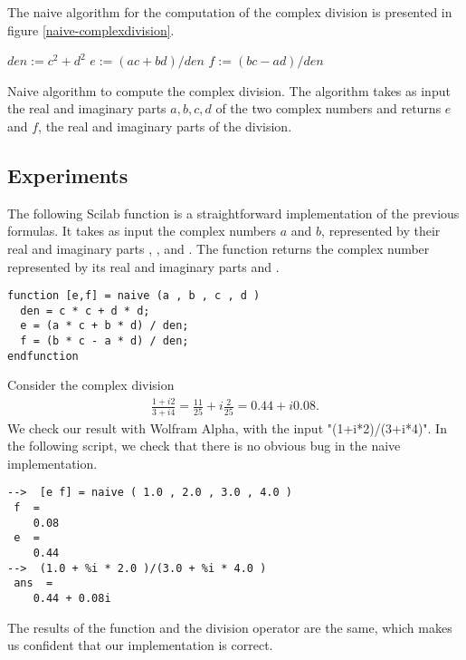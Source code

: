 The naive algorithm for the computation of the complex division
is presented in figure \ref{naive-complexdivision}.

\begin{algorithm}[htbp]
$den := c^2 + d^2$\;
$e := (ac + bd)/ den$\;
$f := (bc - ad)/ den$\;
\caption{Naive algorithm to compute the complex division. The algorithm takes as input the 
real and imaginary parts $a,b,c,d$ of the two complex numbers and returns 
$e$ and $f$, the real and imaginary parts of the division.}
\label{naive-complexdivision}
\end{algorithm}

\subsection{Experiments}

The following Scilab function  is a straightforward implementation
of the previous formulas. It takes as input the complex numbers $a$ and $b$, 
represented by their real and imaginary parts , ,  and 
. The function  returns the complex number represented 
by its real and imaginary parts  and .
\lstset{language=scilabscript}
\begin{lstlisting}
function [e,f] = naive (a , b , c , d )
  den = c * c + d * d;
  e = (a * c + b * d) / den;
  f = (b * c - a * d) / den;
endfunction
\end{lstlisting}

Consider the complex division
\begin{eqnarray}
\label{eq-cd-firstest}
\frac{1 + i2}{3 + i4} = \frac{11}{25}+i \frac{2}{25}= 0.44 +i 0.08 .
\end{eqnarray}
We check our result with Wolfram Alpha\cite{WWWWolframAlpha}, with 
the input "(1+i*2)/(3+i*4)".
In the following script, we check that there is no obvious bug 
in the naive implementation.
\lstset{language=scilabscript}
\begin{lstlisting}
-->  [e f] = naive ( 1.0 , 2.0 , 3.0 , 4.0 )
 f  =
    0.08  
 e  =
    0.44  
-->  (1.0 + %i * 2.0 )/(3.0 + %i * 4.0 )
 ans  =
    0.44 + 0.08i  
\end{lstlisting}
The results of the  function and the division operator are the same,
which makes us confident that our implementation is correct.


